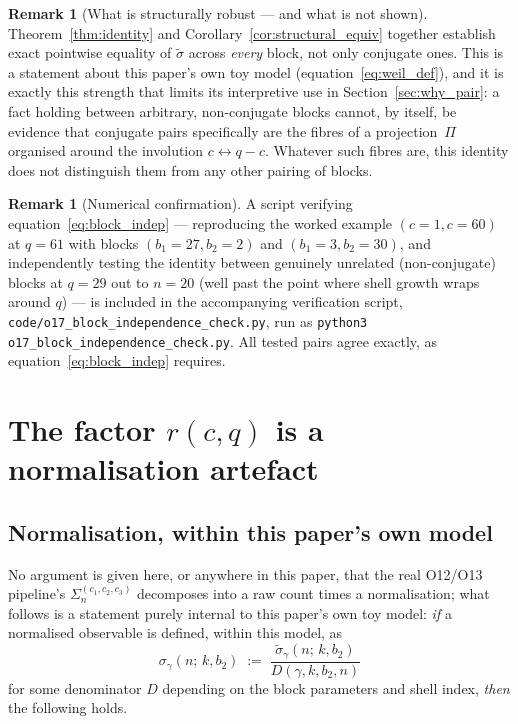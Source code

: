 \documentclass[11pt,a4paper]{article}
\theoremstyle{definition}
\newtheorem{remark}[theorem]{Remark}
\begin{document}
    \begin{remark}[What is structurally robust --- and what is not shown]
Theorem~\ref{thm:identity} and Corollary~\ref{cor:structural_equiv}
together establish exact pointwise equality of $\tilde\sigma$ across
\emph{every} block, not only conjugate ones.
This is a statement about this paper's own toy model
(equation~\eqref{eq:weil_def}), and it is exactly this strength that
limits its interpretive use in Section~\ref{sec:why_pair}: a fact
holding between arbitrary, non-conjugate blocks cannot, by itself, be
evidence that conjugate pairs specifically are the fibres of a
projection~$\Pi$ organised around the involution $c\leftrightarrow q-c$.
Whatever such fibres are, this identity does not distinguish them from
any other pairing of blocks.
    \end{remark}

    \begin{remark}[Numerical confirmation]
A script verifying equation~\eqref{eq:block_indep} --- reproducing the
worked example $(c{=}1,c{=}60)$ at $q=61$ with blocks
$(b_1{=}27,b_2{=}2)$ and $(b_1{=}3,b_2{=}30)$, and independently testing
the identity between genuinely unrelated (non-conjugate) blocks at
$q=29$ out to $n=20$ (well past the point where shell growth wraps
around $q$) --- is included in the accompanying verification script,
\texttt{code/o17\_block\allowbreak\_independence\allowbreak\_check.py},
run as \texttt{python3 o17\_block\allowbreak\_independence\allowbreak\_check.py}.
All tested pairs agree exactly, as equation~\eqref{eq:block_indep}
requires.
    \end{remark}

  \section{The factor \texorpdfstring{$r(c,q)$}{r(c,q)} is a normalisation artefact}
  \label{sec:r_artefact}

  \subsection{Normalisation, within this paper's own model}

    No argument is given here, or anywhere in this paper, that the real
    O12/O13 pipeline's $\Sigma_n^{(c_1,c_2,c_3)}$ decomposes into a raw
    count times a normalisation; what follows is a statement purely
    internal to this paper's own toy model:
    \emph{if} a normalised observable is defined, within this model, as
    \begin{equation}
      \sigma_\gamma(n;\, k, b_2)
      \;:=\; \frac{\tilde\sigma_\gamma(n;\, k, b_2)}{D(\gamma, k, b_2, n)}
      \label{eq:sigma_normalised}
    \end{equation}
    for some denominator $D$ depending on the block parameters and shell
    index, \emph{then} the following holds.
\end{document}
